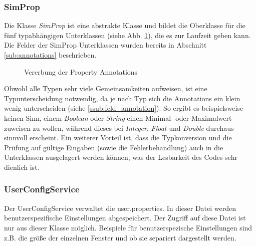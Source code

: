 \documentclass[a4paper, 11pt]{article} %
\begin{document}
\subsubsection{SimProp} %
\label{ssub:simprop}
Die Klasse \emph{SimProp} ist eine abstrakte Klasse und bildet die Oberklasse für die fünf typabhängigen Unterklassen (siehe Abb. \ref{fig:field_annotation}), die es zur Laufzeit geben kann. Die Felder der SimProp Unterklassen wurden bereits in Abschnitt \ref{sub:annotations} beschrieben. \\

\begin{figure}[!htp]
\caption{Vererbung der Property Annotations}
\label{fig:field_annotation}
\end{figure}

 Obwohl alle Typen sehr viele Gemeinsamkeiten aufweisen, ist eine Typunterscheidung notwendig, da je nach Typ sich die Annotations ein klein wenig unterscheiden (siehe \ref{ssub:feld_annotation}). So ergibt es beispielsweise keinen Sinn, einem \emph{Boolean} oder \emph{String} einen Minimal- oder Maximalwert zuweisen zu wollen, während dieses bei \emph{Integer}, \emph{Float} und \emph{Double} durchaus sinnvoll erscheint. Ein weiterer Vorteil ist, dass die Typkonversion und die Prüfung auf gültige Eingaben (sowie die Fehlerbehandlung) auch in die Unterklassen ausgelagert werden können, was der Lesbarkeit des Codes sehr dienlich ist. 

\subsubsection{UserConfigService} %
\label{ssub:userconfigservice}
Der UserConfigService verwaltet die user.properties. In dieser Datei werden benutzerspezifische Einstellungen abgespeichert. Der Zugriff auf diese Datei ist nur aus dieser Klasse möglich. Beispiele für benutzerspezische Einstellungen sind z.B. die größe der einzelnen Fenster und ob sie separiert dargestellt werden.
\end{document}
